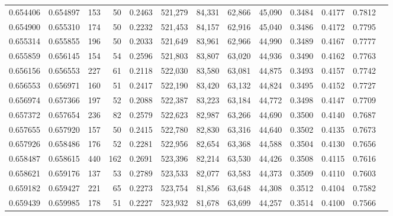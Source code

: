\begin{tabular}{rrrrrrrrrrrrr}
0.654406 & 0.654897 &   153 &  50 &                                     0.2463 & 521,279 &  84,331 &  62,866 &  45,090 & 0.3484 & 0.4177 & 0.7812 \\
0.654900 & 0.655310 &   174 &  50 &                                     0.2232 & 521,453 &  84,157 &  62,916 &  45,040 & 0.3486 & 0.4172 & 0.7795 \\
0.655314 & 0.655855 &   196 &  50 &                                     0.2033 & 521,649 &  83,961 &  62,966 &  44,990 & 0.3489 & 0.4167 & 0.7777 \\
0.655859 & 0.656145 &   154 &  54 &                                     0.2596 & 521,803 &  83,807 &  63,020 &  44,936 & 0.3490 & 0.4162 & 0.7763 \\
0.656156 & 0.656553 &   227 &  61 &                                     0.2118 & 522,030 &  83,580 &  63,081 &  44,875 & 0.3493 & 0.4157 & 0.7742 \\
0.656553 & 0.656971 &   160 &  51 &                                     0.2417 & 522,190 &  83,420 &  63,132 &  44,824 & 0.3495 & 0.4152 & 0.7727 \\
0.656974 & 0.657366 &   197 &  52 &                                     0.2088 & 522,387 &  83,223 &  63,184 &  44,772 & 0.3498 & 0.4147 & 0.7709 \\
0.657372 & 0.657654 &   236 &  82 &                                     0.2579 & 522,623 &  82,987 &  63,266 &  44,690 & 0.3500 & 0.4140 & 0.7687 \\
0.657655 & 0.657920 &   157 &  50 &                                     0.2415 & 522,780 &  82,830 &  63,316 &  44,640 & 0.3502 & 0.4135 & 0.7673 \\
0.657926 & 0.658486 &   176 &  52 &                                     0.2281 & 522,956 &  82,654 &  63,368 &  44,588 & 0.3504 & 0.4130 & 0.7656 \\
0.658487 & 0.658615 &   440 & 162 &                                     0.2691 & 523,396 &  82,214 &  63,530 &  44,426 & 0.3508 & 0.4115 & 0.7616 \\
0.658621 & 0.659176 &   137 &  53 &                                     0.2789 & 523,533 &  82,077 &  63,583 &  44,373 & 0.3509 & 0.4110 & 0.7603 \\
0.659182 & 0.659427 &   221 &  65 &                                     0.2273 & 523,754 &  81,856 &  63,648 &  44,308 & 0.3512 & 0.4104 & 0.7582 \\
0.659439 & 0.659985 &   178 &  51 &                                     0.2227 & 523,932 &  81,678 &  63,699 &  44,257 & 0.3514 & 0.4100 & 0.7566 \\

\end{tabular}
